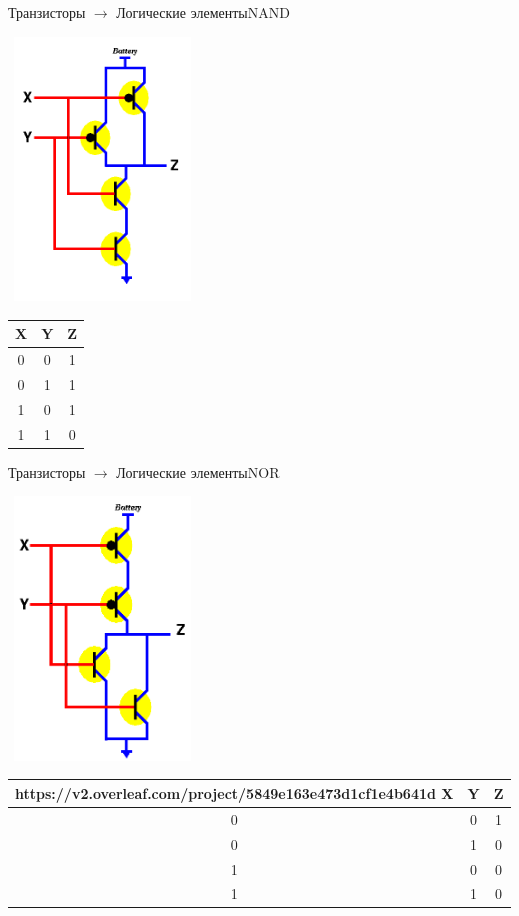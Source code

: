 \documentclass[10pt]{beamer}
\begin{document}
\begin{frame}[fragile]{Транзисторы $\rightarrow$ Логические элементы}{NAND}
\begin{multicols}{2}
\includegraphics[width=5cm, height=7cm]{Term_1/Source/Pirctures/nand-circuit.png}
\vfill\eject
\begin{tabular}{ c|c|c } 
X &	Y & Z \\ 
  \hline
0 & 0 & 1\\
  \hline
0 & 1 & 1 \\
 \hline
1 & 0 & 1 \\
 \hline
1 & 1 & 0 \\
\end{tabular}
\end{multicols}
\end{frame}

\begin{frame}[fragile]{Транзисторы $\rightarrow$ Логические элементы}{NOR}
\begin{multicols}{2}
\includegraphics[width=5cm, height=7cm]{Term_1/Source/Pirctures/nor-circuit.png}
\vfill\eject
\begin{tabular}{ c|c|c } https://v2.overleaf.com/project/5849e163e473d1cf1e4b641d
X &	Y & Z \\ 
  \hline
0 & 0 & 1\\
  \hline
0 & 1 & 0 \\
 \hline
1 & 0 & 0 \\
 \hline
1 & 1 & 0 \\
\end{tabular}
\end{multicols}
\end{frame}
\end{document}
